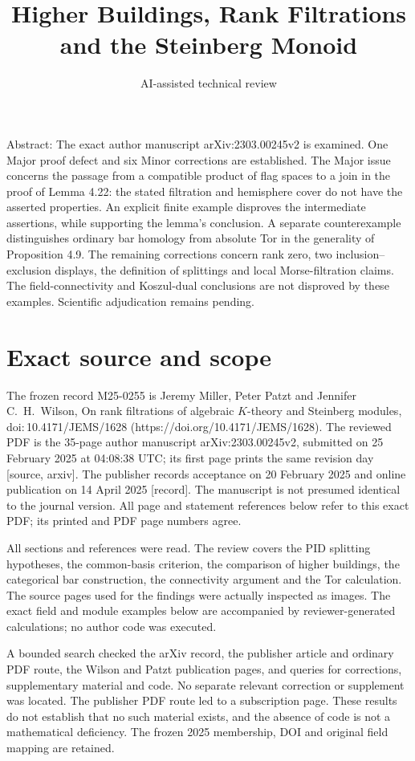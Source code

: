 \documentclass[10pt]{article}
\title{Higher Buildings, Rank Filtrations
and the Steinberg Monoid}
\author{AI-assisted technical review}
\date{}
\begin{document}
\maketitle
Abstract: The exact author manuscript arXiv:2303.00245v2 is examined. One Major proof defect and six Minor corrections are established. The Major issue concerns the passage from a compatible product of flag spaces to a join in the proof of Lemma 4.22: the stated filtration and hemisphere cover do not have the asserted properties. An explicit finite example disproves the intermediate assertions, while supporting the lemma’s conclusion. A separate counterexample distinguishes ordinary bar homology from absolute Tor in the generality of Proposition 4.9. The remaining corrections concern rank zero, two inclusion–exclusion displays, the definition of splittings and local Morse-filtration claims. The field-connectivity and Koszul-dual conclusions are not disproved by these examples. Scientific adjudication remains pending.\par
\section*{Exact source and scope}
The frozen record M25-0255 is Jeremy Miller, Peter Patzt and Jennifer C. H. Wilson, On rank filtrations of algebraic \(K\)-theory and Steinberg modules, doi: 10.4171/JEMS/1628 (https://doi.org/10.4171/JEMS/1628). The reviewed PDF is the 35-page author manuscript arXiv:2303.00245v2, submitted on 25 February 2025 at 04:08:38 UTC; its first page prints the same revision day [source, arxiv]. The publisher records acceptance on 20 February 2025 and online publication on 14 April 2025 [record]. The manuscript is not presumed identical to the journal version. All page and statement references below refer to this exact PDF; its printed and PDF page numbers agree.\par
All sections and references were read. The review covers the PID splitting hypotheses, the common-basis criterion, the comparison of higher buildings, the categorical bar construction, the connectivity argument and the Tor calculation. The source pages used for the findings were actually inspected as images. The exact field and module examples below are accompanied by reviewer-generated calculations; no author code was executed.\par
A bounded search checked the arXiv record, the publisher article and ordinary PDF route, the Wilson and Patzt publication pages, and queries for corrections, supplementary material and code. No separate relevant correction or supplement was located. The publisher PDF route led to a subscription page. These results do not establish that no such material exists, and the absence of code is not a mathematical deficiency. The frozen 2025 membership, DOI and original field mapping are retained.\par
\end{document}
